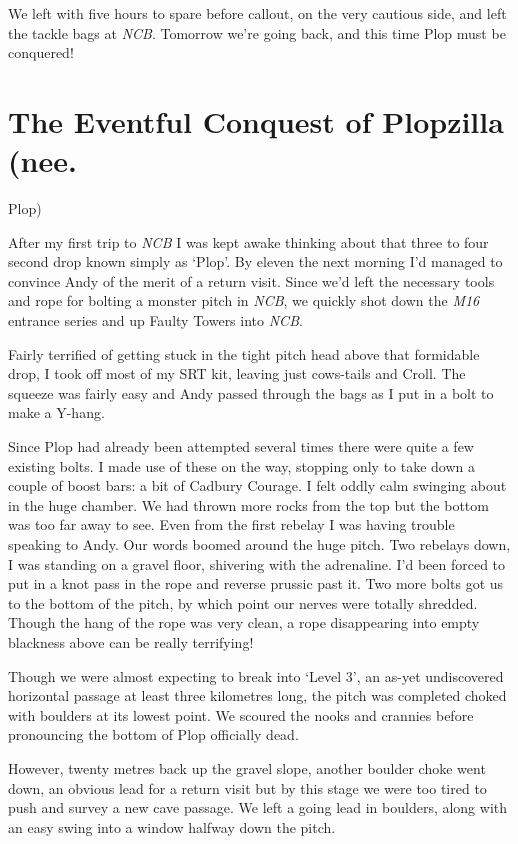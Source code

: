 We left with five hours to spare before callout, on the very cautious
side, and left the tackle bags at \emph{NCB}. Tomorrow we're going back,
and this time Plop must be conquered!


\hypertarget{the-eventful-conquest-of-plopzilla-nee.}{%
\section{The Eventful Conquest of Plopzilla
(nee.}\label{the-eventful-conquest-of-plopzilla-nee.}}

Plop)

After my first trip to \emph{NCB} I was kept awake thinking about that
three to four second drop known simply as `Plop'. By eleven the next
morning I'd managed to convince Andy of the merit of a return visit.
Since we'd left the necessary tools and rope for bolting a monster pitch
in \emph{NCB}, we quickly shot down the \emph{M16} entrance series and
up Faulty Towers into \emph{NCB}.

Fairly terrified of getting stuck in the tight pitch head above that
formidable drop, I took off most of my SRT kit, leaving just cows-tails
and Croll. The squeeze was fairly easy and Andy passed through the bags
as I put in a bolt to make a Y-hang.

Since Plop had already been attempted several times there were quite a
few existing bolts. I made use of these on the way, stopping only to
take down a couple of boost bars: a bit of Cadbury Courage. I felt oddly
calm swinging about in the huge chamber. We had thrown more rocks from
the top but the bottom was too far away to see. Even from the first
rebelay I was having trouble speaking to Andy. Our words boomed around
the huge pitch. Two rebelays down, I was standing on a gravel floor,
shivering with the adrenaline. I'd been forced to put in a knot pass in
the rope and reverse prussic past it. Two more bolts got us to the
bottom of the pitch, by which point our nerves were totally shredded.
Though the hang of the rope was very clean, a rope disappearing into
empty blackness above can be really terrifying!

Though we were almost expecting to break into `Level 3', an as-yet
undiscovered horizontal passage at least three kilometres long, the
pitch was completed choked with boulders at its lowest point. We scoured
the nooks and crannies before pronouncing the bottom of Plop officially
dead.

However, twenty metres back up the gravel slope, another boulder choke
went down, an obvious lead for a return visit but by this stage we were
too tired to push and survey a new cave passage. We left a going lead in
boulders, along with an easy swing into a window halfway down the pitch.

